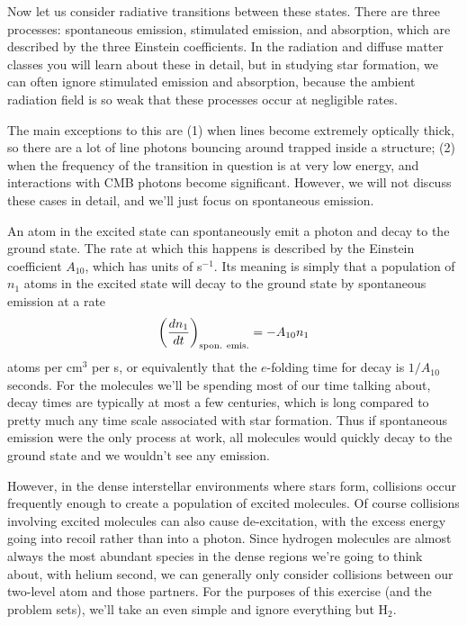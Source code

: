 Now let us consider radiative transitions between these states. There are three processes: spontaneous emission, stimulated emission, and absorption, which are described by the three Einstein coefficients. In the radiation and diffuse matter classes you will learn about these in detail, but in studying star formation, we can often ignore stimulated emission and absorption, because the ambient radiation field is so weak that these processes occur at negligible rates.

The main exceptions to this are (1) when lines become extremely optically thick, so there are a lot of line photons bouncing around trapped inside a structure; (2) when the frequency of the transition in question is at very low energy, and interactions with CMB photons become significant. However, we will not discuss these cases in detail, and we'll just focus on spontaneous emission.

An atom in the excited state can spontaneously emit a photon and decay to the ground state. The rate at which this happens is described by the Einstein coefficient $A_{10}$, which has units of s$^{-1}$. Its meaning is simply that a population of $n_1$ atoms in the excited state will decay to the ground state by spontaneous emission at a rate 
\begin{equation}
\left(\frac{dn_1}{dt}\right)_{\rm spon.~emis.} = -A_{10} n_1
\end{equation}
atoms per cm$^3$ per s, or equivalently that the $e$-folding time for decay is $1/A_{10}$ seconds. For the molecules we'll be spending most of our time talking about, decay times are typically at most a few centuries, which is long compared to pretty much any time scale associated with star formation. Thus if spontaneous emission were the only process at work, all molecules would quickly decay to the ground state and we wouldn't see any emission.

However, in the dense interstellar environments where stars form, collisions occur frequently enough to create a population of excited molecules. Of course collisions involving excited molecules can also cause de-excitation, with the excess energy going into recoil rather than into a photon. Since hydrogen molecules are almost always the most abundant species in the dense regions we're going to think about, with helium second, we can generally only consider collisions between our two-level atom and those partners. For the purposes of this exercise (and the problem sets), we'll take an even simple and ignore everything but H$_2$.


